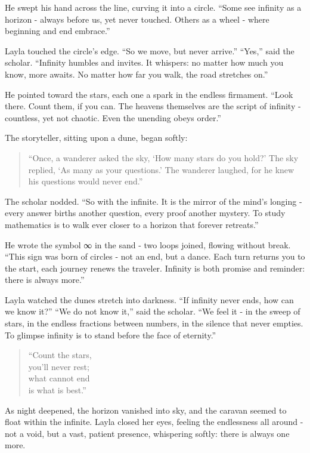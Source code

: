 \documentclass[
  letterpaper,
  DIV=11,
  numbers=noendperiod]{scrreprt}
\begin{document}
He swept his hand across the line, curving it into a circle. ``Some see
infinity as a horizon - always before us, yet never touched. Others as a
wheel - where beginning and end embrace.''

Layla touched the circle's edge. ``So we move, but never arrive.''
``Yes,'' said the scholar. ``Infinity humbles and invites. It whispers:
no matter how much you know, more awaits. No matter how far you walk,
the road stretches on.''

He pointed toward the stars, each one a spark in the endless firmament.
``Look there. Count them, if you can. The heavens themselves are the
script of infinity - countless, yet not chaotic. Even the unending obeys
order.''

The storyteller, sitting upon a dune, began softly:

\begin{quote}
``Once, a wanderer asked the sky, `How many stars do you hold?' The sky
replied, `As many as your questions.' The wanderer laughed, for he knew
his questions would never end.''
\end{quote}

The scholar nodded. ``So with the infinite. It is the mirror of the
mind's longing - every answer births another question, every proof
another mystery. To study mathematics is to walk ever closer to a
horizon that forever retreats.''

He wrote the symbol ∞ in the sand - two loops joined, flowing without
break. ``This sign was born of circles - not an end, but a dance. Each
turn returns you to the start, each journey renews the traveler.
Infinity is both promise and reminder: there is always more.''

Layla watched the dunes stretch into darkness. ``If infinity never ends,
how can we know it?'' ``We do not know it,'' said the scholar. ``We feel
it - in the sweep of stars, in the endless fractions between numbers, in
the silence that never empties. To glimpse infinity is to stand before
the face of eternity.''

\begin{quote}
``Count the stars,\\
you'll never rest;\\
what cannot end\\
is what is best.''
\end{quote}

As night deepened, the horizon vanished into sky, and the caravan seemed
to float within the infinite. Layla closed her eyes, feeling the
endlessness all around - not a void, but a vast, patient presence,
whispering softly: there is always one more.
\end{document}
